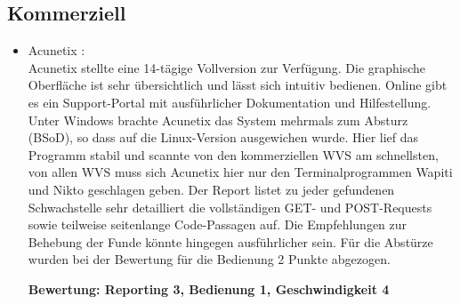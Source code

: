 \documentclass[12pt,oneside,a4paper,parskip]{scrbook}
\begin{document}
    \subsection{Kommerziell}
      \begin{itemize}
        \item Acunetix \cite{Acunetix}:\\
          Acunetix stellte eine 14-tägige Vollversion zur Verfügung. Die graphische Oberfläche ist sehr übersichtlich und lässt sich intuitiv bedienen. Online gibt es ein Support-Portal mit ausführlicher Dokumentation und Hilfestellung.
          Unter Windows brachte Acunetix das System mehrmals zum Absturz (BSoD), so dass auf die Linux-Version ausgewichen wurde. Hier lief das Programm stabil und scannte von den kommerziellen WVS am schnellsten, von allen WVS muss sich Acunetix hier nur den Terminalprogrammen Wapiti und Nikto geschlagen geben. Der Report listet zu jeder gefundenen Schwachstelle sehr detailliert die vollständigen GET- und POST-Requests sowie teilweise seitenlange Code-Passagen auf. Die Empfehlungen zur Behebung der Funde könnte hingegen ausführlicher sein. Für die Abstürze wurden bei der Bewertung für die Bedienung 2 Punkte abgezogen.

          \textbf{Bewertung: Reporting 3, Bedienung 1, Geschwindigkeit 4}\\


\end{itemize}
\end{document}
